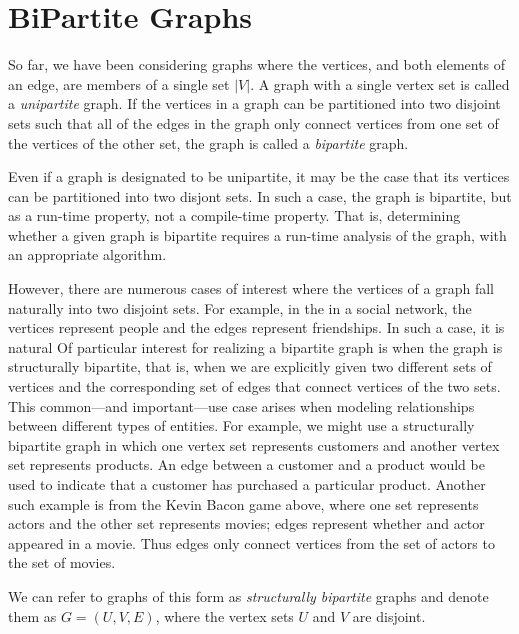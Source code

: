 \section{BiPartite Graphs}

So far, we have been considering graphs where the vertices, and both elements of an
edge, are members of a single set $|V|$. A graph with a single vertex set is called a
\emph{unipartite} graph. If the vertices in a graph can be partitioned into two
disjoint sets such that all of the edges in the graph only connect vertices from one
set of the vertices of the other set, the graph is called a \emph{bipartite} graph.

Even if a graph is designated to be unipartite, it may be the case that its vertices
can be partitioned into two disjont sets. In such a case, the graph is bipartite,
but as a run-time property, not a compile-time property.
That is, determining whether a given graph is bipartite requires a run-time analysis
of the graph, with an appropriate algorithm.

However, there are numerous cases of interest where the vertices of a graph fall
naturally into two disjoint sets. For example, in the
in a social network, the vertices
represent people and the edges represent friendships. In such a case, it is natural
Of particular interest for realizing a bipartite graph is when the graph is
structurally bipartite, that is, when we are explicitly given two different
sets of vertices and the corresponding set of edges that connect vertices of the two sets.
This common---and important---use case arises when modeling relationships
between different types of entities. For example, we might use a structurally
bipartite graph in which one vertex set represents customers and another vertex
set represents products. An edge between a customer and a product would be used
to indicate that a customer has purchased a particular product.
Another such example is from the Kevin Bacon game above, where
one set represents actors and the other set represents movies; edges represent whether
and actor appeared in a movie. Thus edges only connect vertices from the set of actors
to the set of movies.

We can refer to graphs of this form as \emph{structurally bipartite} graphs and
denote them as $G = (U, V, E)$, where the vertex sets $U$ and $V$ are disjoint.

